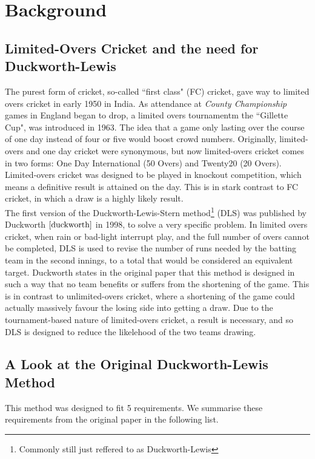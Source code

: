 \chapter{Background}

\section{Limited-Overs Cricket and the need for Duckworth-Lewis}
The purest form of cricket, so-called ``first class" (FC) cricket, gave way to limited overs cricket in early 1950 in India. As attendance at \textit{County Championship} games in England began to drop, a limited overs tournamentm the ``Gillette Cup", was introduced in 1963. The idea that a game only lasting over the course of one day instead of four or five would boost crowd numbers. Originally, limited-overs and one day cricket were synonymous, but now limited-overs cricket comes in two forms: One Day International (50 Overs) and Twenty20 (20 Overs). Limited-overs cricket was designed to be played in knockout competition, which means a definitive result is attained on the day. This is in stark contrast to FC cricket, in which a draw is a highly likely result. \\


The first version of the Duckworth-Lewis-Stern method\footnote{Commonly still just reffered to as Duckworth-Lewis} (DLS) was published by Duckworth $\cite{duckworth}$ in 1998, to solve a very specific problem. In limited overs cricket, when rain or bad-light interrupt play, and the full number of overs cannot be completed, DLS is used to revise the number of runs needed by the batting team in the second innings, to a total that would be considered an equivalent target. Duckworth states in the original paper that this method is designed in such a way that no team benefits or suffers from the shortening of the game. This is in contrast to unlimited-overs cricket, where a shortening of the game could actually massively favour the losing side into getting a draw. Due to the tournament-based nature of limited-overs cricket, a result is necessary, and so DLS is designed to reduce the likelehood of the two teams drawing. \\

\section{A Look at the Original Duckworth-Lewis Method}
This method was designed to fit 5 requirements. We summarise these requirements from the original paper in the following list.

